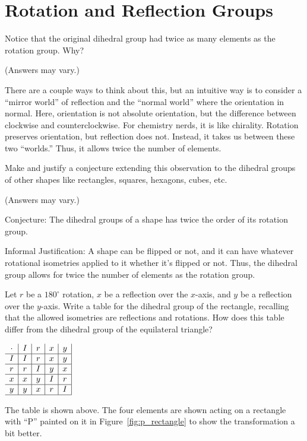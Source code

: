 \documentclass[../gatm_answers.tex]{subfiles}
\begin{document}
\section{Rotation and Reflection Groups}

\begin{outer_problem}
\item Notice that the original dihedral group had twice as many elements as the rotation group. Why?
\end{outer_problem}

(Answers may vary.)

There are a couple ways to think about this, but an intuitive way is to consider a ``mirror world'' of reflection and the ``normal world'' where the orientation in normal. Here, orientation is not absolute orientation, but the difference between clockwise and counterclockwise. For chemistry nerds, it is like chirality. Rotation preserves orientation, but reflection does not. Instead, it takes us between these two ``worlds.'' Thus, it allows twice the number of elements.

\begin{outer_problem}
\item Make and justify a conjecture extending this observation to the dihedral groups of other shapes like rectangles, squares, hexagons, cubes, etc.
\end{outer_problem}

(Answers may vary.)

Conjecture: The dihedral groups of a shape has twice the order of its rotation group.

Informal Justification: A shape can be flipped or not, and it can have whatever rotational isometries applied to it whether it's flipped or not. Thus, the dihedral group allows for twice the number of elements as the rotation group.

\begin{outer_problem}
\item Let $r$ be a $180^{\circ}$ rotation, $x$ be a reflection over the $x$-axis, and $y$ be a reflection over the $y$-axis. Write a table for the dihedral group of the rectangle, recalling that the allowed isometries are reflections and rotations. How does this table differ from the dihedral group of the equilateral triangle?
\end{outer_problem}

\begin{center}
$\begin{array}{c|c|c|c|c|}
\cdot & I & r & x & y \\ \hline
I & I & r & x & y \\ \hline
r & r & I & y & x \\ \hline
x & x & y & I & r \\ \hline
y & y & x & r & I \\ \hline
\end{array}$
\end{center}
The table is shown above. The four elements are shown acting on a rectangle with ``P'' painted on it in Figure~\ref{fig:p_rectangle} to show the transformation a bit better.
\end{document}
